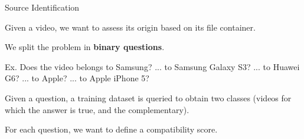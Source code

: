 \begin{tframe}{Source Identification}

\vspace{0.1cm}

Given a video, we want to assess its origin based on its file container.

\vspace{0.5cm}

We split the problem in \textbf{binary questions}.

\vspace{0.5cm}

Ex. Does the video belongs to Samsung? \newline
	 ... to Samsung Galaxy S3? \newline
	 ... to Huawei G6? \newline
	 ... to Apple? \newline
	 ... to Apple iPhone 5? \newline
	 
\vspace{0.1cm}

Given a question, a training dataset is queried to obtain two classes (videos for which the answer is true, and the complementary).

\vspace{0.5cm}

For each question, we want to define a compatibility score.

\end{tframe}


